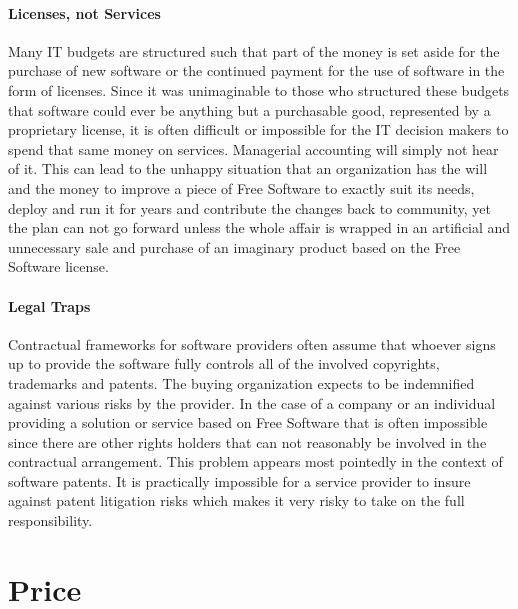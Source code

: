 \paragraph*{Licenses, not Services}

Many IT budgets are structured such that part of the money is set aside
for the purchase of new software or the continued payment for the use of software
in the form of licenses. Since it was unimaginable to those who structured these
budgets that software could ever be anything but a purchasable good, represented
by a proprietary license, it is often difficult or impossible for the IT decision
makers to spend that same money on services. Managerial accounting will simply not hear of it.
This can lead to the unhappy situation that an organization has the will and the
money to improve a piece of Free Software to exactly suit its needs, deploy and run
it for years and contribute the changes back to community, yet the plan can not
go forward unless the whole affair is wrapped in an artificial and unnecessary sale
and purchase of an imaginary product based on the Free Software license.

\paragraph*{Legal Traps}

Contractual frameworks for software providers often assume
that whoever signs up to provide the software fully controls all of the involved 
copyrights, trademarks and patents. The buying organization expects to be indemnified against various
risks by the provider. In the case of a company or an individual providing a solution
or service based on Free Software that is often impossible since there are other
rights holders that can not reasonably be involved in the contractual arrangement.
This problem appears most pointedly in the context of software patents. It is practically
impossible for a service provider to insure against patent litigation risks which makes
it very risky to take on the full responsibility.

\section*{Price}

